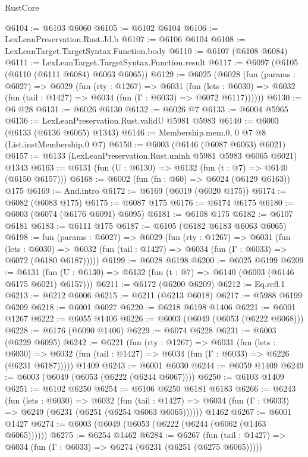 \begin{lexlean}{RustCore}
\begin{coremodule}
{\begin{coremodule}
{{{{{{{{{{{{{{{{{{{{{{{{{{{{{{{{{{{{{{{{{{{{{{{@6104 := @6103 @6060
@6105 := @6102 @6104
@6106 := LexLeanPreservation.Rust.Jd.b
@6107 := @6106 @6104
@6108 := LexLeanTarget.TargetSyntax.Function.body
@6110 := @6107 (@6108 @6084)
@6111 := LexLeanTarget.TargetSyntax.Function.result
@6117 := @6097 (@6105 (@6110 (@6111 @6084) @6063 @6065))
@6129 := @6025
    (@6028
      (fun (params : @6027) =>
      @6029
        (fun (rty : @1267) =>
        @6031
          (fun (lets : @6030) =>
          @6032 (fun (tail : @1427) => @6034 (fun (Γ : @6033) => @6072 @6117))))))
@6130 := @6 @28
@6131 := @6026 @6130
@6132 := @6026 @7
@6133 := @6004 @5965
@6136 := LexLeanPreservation.Rust.validU @5981 @5983
@6140 := @6003 (@6133 (@6136 @6065) @1343)
@6146 := Membership.mem.{0, 0} @7 @8 (List.instMembership.{0} @7)
@6150 := @6003 (@6146 (@6087 @6063) @6021)
@6157 := @6133 (LexLeanPreservation.Rust.uninh @5981 @5983 @6065 @6021) @1343
@6163 := @6131 (fun (U : @6130) => @6132 (fun (t : @7) => @6140 (@6150 @6157)))
@6168 := @6002 (fun (fn : @60) => @6024 (@6129 @6163)) @175
@6169 := And.intro
@6172 := @6169 (@6019 (@6020 @175))
@6174 := @6082 (@6083 @175)
@6175 := @6087 @175
@6176 := @6174 @6175
@6180 := @6003 (@6074 (@6176 @6091) @6095)
@6181 := @6108 @175
@6182 := @6107 @6181
@6183 := @6111 @175
@6187 := @6105 (@6182 @6183 @6063 @6065)
@6198 := fun (params : @6027) =>
  @6029
    (fun (rty : @1267) =>
    @6031
      (fun (lets : @6030) =>
      @6032 (fun (tail : @1427) => @6034 (fun (Γ : @6033) => @6072 (@6180 @6187)))))
@6199 := @6028 @6198
@6200 := @6025 @6199
@6209 := @6131 (fun (U : @6130) => @6132 (fun (t : @7) => @6140 (@6003 (@6146 @6175 @6021) @6157)))
@6211 := @6172 (@6200 @6209)
@6212 := Eq.refl.{1}
@6213 := @6212 @6006
@6215 := @6211 (@6213 @6018)
@6217 := @5988 @6199 @6209
@6218 := @6001 @6027
@6220 := @6218 @6198 @1406
@6221 := @6001 @1267
@6222 := @6055 @1406
@6226 := @6003 (@6049 (@6053 (@6222 @6068)))
@6228 := @6176 (@6090 @1406)
@6229 := @6074 @6228
@6231 := @6003 (@6229 @6095)
@6242 := @6221
    (fun (rty : @1267) =>
    @6031
      (fun (lets : @6030) =>
      @6032 (fun (tail : @1427) => @6034 (fun (Γ : @6033) => @6226 (@6231 @6187)))))
    @1409
@6243 := @6001 @6030
@6244 := @6059 @1409
@6249 := @6003 (@6049 (@6053 (@6222 (@6244 @6067))))
@6250 := @6103 @1409
@6251 := @6102 @6250
@6254 := @6106 @6250 @6181 @6183
@6266 := @6243
    (fun (lets : @6030) =>
    @6032
      (fun (tail : @1427) => @6034 (fun (Γ : @6033) => @6249 (@6231 (@6251 (@6254 @6063 @6065))))))
    @1462
@6267 := @6001 @1427
@6274 := @6003 (@6049 (@6053 (@6222 (@6244 (@6062 (@1463 @6065))))))
@6275 := @6254 @1462
@6284 := @6267
    (fun (tail : @1427) => @6034 (fun (Γ : @6033) => @6274 (@6231 (@6251 (@6275 @6065)))))
}}}}}}}}}}}}}}}}}}}}}}}}}}}}}}}}}}}}}}}}}}}}}}}
\end{coremodule}}
\end{coremodule}
\end{lexlean}
